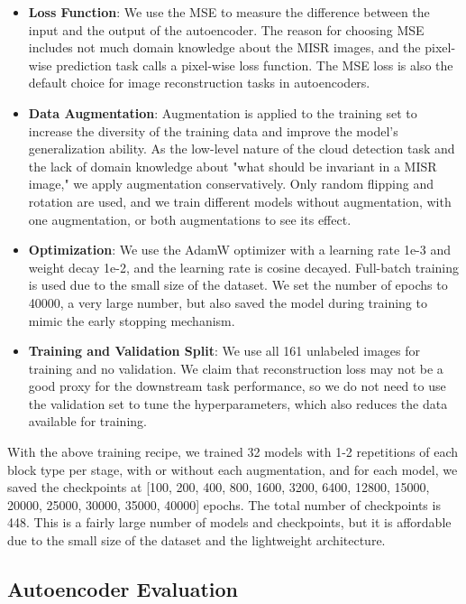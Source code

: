 \documentclass[10pt,letterpaper]{article}
\begin{document}
\begin{itemize}
    \item \textbf{Loss Function}: We use the MSE to measure the difference between the input and the output of the autoencoder. The reason for choosing MSE includes not much domain knowledge about the MISR images, and the pixel-wise prediction task calls a pixel-wise loss function. The MSE loss is also the default choice for image reconstruction tasks in autoencoders.
    
    \item \textbf{Data Augmentation}: Augmentation is applied to the training set to increase the diversity of the training data and improve the model's generalization ability. As the low-level nature of the cloud detection task and the lack of domain knowledge about "what should be invariant in a MISR image," we apply augmentation conservatively. Only random flipping and rotation are used, and we train different models without augmentation, with one augmentation, or both augmentations to see its effect.
    
    \item \textbf{Optimization}: We use the AdamW optimizer with a learning rate 1e-3 and weight decay 1e-2, and the learning rate is cosine decayed. Full-batch training is used due to the small size of the dataset. We set the number of epochs to 40000, a very large number, but also saved the model during training to mimic the early stopping mechanism.
    
    \item \textbf{Training and Validation Split}: We use all 161 unlabeled images for training and no validation. We claim that reconstruction loss may not be a good proxy for the downstream task performance, so we do not need to use the validation set to tune the hyperparameters, which also reduces the data available for training.
    
\end{itemize}

With the above training recipe, we trained 32 models with 1-2 repetitions of each block type per stage, with or without each augmentation, and for each model, we saved the checkpoints at [100, 200, 400, 800, 1600, 3200, 6400, 12800, 15000, 20000, 25000, 30000, 35000, 40000] epochs. The total number of checkpoints is 448. This is a fairly large number of models and checkpoints, but it is affordable due to the small size of the dataset and the lightweight architecture.

\subsection{Autoencoder Evaluation}
\end{document}
